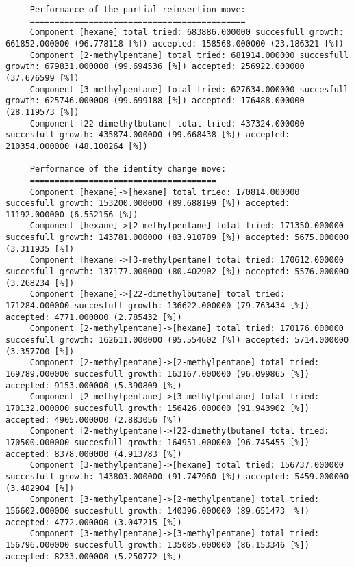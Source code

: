 \begin{tiny}
\begin{verbatim}
     Performance of the partial reinsertion move:
     ============================================
     Component [hexane] total tried: 683886.000000 succesfull growth: 661852.000000 (96.778118 [%]) accepted: 158568.000000 (23.186321 [%])
     Component [2-methylpentane] total tried: 681914.000000 succesfull growth: 679831.000000 (99.694536 [%]) accepted: 256922.000000 (37.676599 [%])
     Component [3-methylpentane] total tried: 627634.000000 succesfull growth: 625746.000000 (99.699188 [%]) accepted: 176488.000000 (28.119573 [%])
     Component [22-dimethylbutane] total tried: 437324.000000 succesfull growth: 435874.000000 (99.668438 [%]) accepted: 210354.000000 (48.100264 [%])

     Performance of the identity change move:
     ======================================
     Component [hexane]->[hexane] total tried: 170814.000000 succesfull growth: 153200.000000 (89.688199 [%]) accepted: 11192.000000 (6.552156 [%])
     Component [hexane]->[2-methylpentane] total tried: 171350.000000 succesfull growth: 143781.000000 (83.910709 [%]) accepted: 5675.000000 (3.311935 [%])
     Component [hexane]->[3-methylpentane] total tried: 170612.000000 succesfull growth: 137177.000000 (80.402902 [%]) accepted: 5576.000000 (3.268234 [%])
     Component [hexane]->[22-dimethylbutane] total tried: 171284.000000 succesfull growth: 136622.000000 (79.763434 [%]) accepted: 4771.000000 (2.785432 [%])
     Component [2-methylpentane]->[hexane] total tried: 170176.000000 succesfull growth: 162611.000000 (95.554602 [%]) accepted: 5714.000000 (3.357700 [%])
     Component [2-methylpentane]->[2-methylpentane] total tried: 169789.000000 succesfull growth: 163167.000000 (96.099865 [%]) accepted: 9153.000000 (5.390809 [%])
     Component [2-methylpentane]->[3-methylpentane] total tried: 170132.000000 succesfull growth: 156426.000000 (91.943902 [%]) accepted: 4905.000000 (2.883056 [%])
     Component [2-methylpentane]->[22-dimethylbutane] total tried: 170500.000000 succesfull growth: 164951.000000 (96.745455 [%]) accepted: 8378.000000 (4.913783 [%])
     Component [3-methylpentane]->[hexane] total tried: 156737.000000 succesfull growth: 143803.000000 (91.747960 [%]) accepted: 5459.000000 (3.482904 [%])
     Component [3-methylpentane]->[2-methylpentane] total tried: 156602.000000 succesfull growth: 140396.000000 (89.651473 [%]) accepted: 4772.000000 (3.047215 [%])
     Component [3-methylpentane]->[3-methylpentane] total tried: 156796.000000 succesfull growth: 135085.000000 (86.153346 [%]) accepted: 8233.000000 (5.250772 [%])

\end{verbatim}
\end{tiny}
